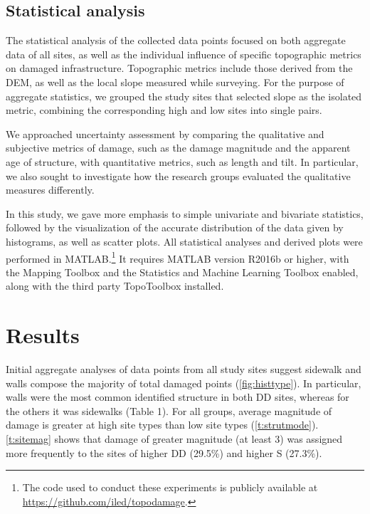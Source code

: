 \documentclass[final,12pt,times,twocolumn,authoryear]{elsarticle}
\begin{document}
\subsection{Statistical analysis}
The statistical analysis of the collected data points focused on both aggregate data of all sites, as well as the individual influence of specific topographic metrics on damaged infrastructure. Topographic metrics include those derived from the DEM, as well as the local slope measured while surveying. For the purpose of aggregate statistics, we grouped the study sites that selected slope as the isolated metric, combining the corresponding high and low sites into single pairs.

We approached uncertainty assessment by comparing the qualitative and subjective metrics of damage, such as the damage magnitude and the apparent age of structure, with quantitative metrics, such as length and tilt. In particular, we also sought to investigate how the research groups evaluated the qualitative measures differently.

In this study, we gave more emphasis to simple univariate and bivariate statistics, followed by the visualization of the accurate distribution of the data given by histograms, as well as scatter plots. All statistical analyses and derived plots were performed in MATLAB.\footnote{The code used to conduct these experiments is publicly available at \url{https://github.com/iled/topodamage}.} It requires MATLAB version R2016b or higher, with the Mapping Toolbox and the Statistics and Machine Learning Toolbox enabled, along with the third party TopoToolbox installed.


\section{Results}
\label{s:results}

Initial aggregate analyses of data points from all study sites suggest sidewalk and walls compose the majority of total damaged points (\autoref{fig:histtype}). In particular, walls were the most common identified structure in both DD sites, whereas for the others it was sidewalks (Table 1). For all groups, average magnitude of damage is greater at high site types than low site types (\autoref{t:strutmode}). \autoref{t:sitemag} shows that damage of greater magnitude (at least 3) was assigned more frequently to the sites of higher DD (29.5\%) and higher S (27.3\%).
\end{document}

